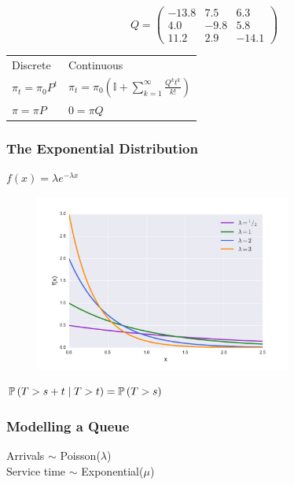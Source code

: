 \documentclass{beamer}
\begin{document}
\begin{frame}
\huge{
\begin{equation*}
 Q =  \left( \begin{array}{ccc}
-13.8 & 7.5 & 6.3 \\
4.0 & -9.8 & 5.8 \\
11.2 & 2.9 & -14.1 \end{array} \right)
\end{equation*}
}
\end{frame}



\begin{frame}
\begin{center}
\begin{tabular}{p{3cm}|p{5.5cm}}
\Large Discrete & \Large Continuous \\[5ex]
\Large $ \pi_t = \pi_0P^{t} $ & \Large $ \pi_t = \pi_0\left(\mathbb{I} + \sum_{k=1}^{\infty}\frac{Q^kt^k}{k!}\right) $ \\[5ex]
\Large $ \pi = \pi P $ & \Large $ 0 = \pi Q $ \\[5ex]
\end{tabular}
\end{center}
\end{frame}


\begin{frame}
\frametitle{The Exponential Distribution}
\begin{center}
$f(x) = \lambda e^{-\lambda x}$
\begin{figure}
\includegraphics[width=0.75\textwidth]{expon_dist}
\end{figure}
$\mathbb{P}\left(T > s + t \nonscript\; | \nonscript\; T > t\right) = \mathbb{P}\left(T > s\right)$
\end{center}
\end{frame}


\begin{frame}
\frametitle{Modelling a Queue}
\begin{figure}
  
\end{figure}

\begin{tcolorbox}[colback=orange!25!yellow!25,colframe=orange!50!yellow]
\begin{center}
Arrivals $\sim$ Poisson($\lambda$)\\
Service time $\sim$ Exponential($\mu$)
\end{center}
\end{tcolorbox}
\end{frame}
\end{document}
